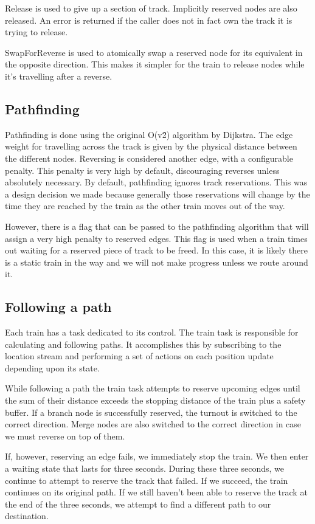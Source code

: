 \documentclass{article}
\begin{document}
Release is used to give up a section of track. Implicitly reserved nodes are also released. An error is returned if the caller does not in fact own the track it is trying to release.

SwapForReverse is used to atomically swap a reserved node for its equivalent in the opposite direction. This makes it simpler for the train to release nodes while it's travelling after a reverse.

\subsection{Pathfinding}

Pathfinding is done using the original O(v\^2) algorithm by Dijkstra. The edge weight for travelling across the track is given by the physical distance between the different nodes. Reversing is considered another edge, with a configurable penalty. This penalty is very high by default, discouraging reverses unless absolutely necessary. By default, pathfinding ignores track reservations. This was a design decision we made because generally those reservations will change by the time they are reached by the train as the other train moves out of the way.

However, there is a flag that can be passed to the pathfinding algorithm that will assign a very high penalty to reserved edges. This flag is used when a train times out waiting for a reserved piece of track to be freed. In this case, it is likely there is a static train in the way and we will not make progress unless we route around it.

\subsection{Following a path}

Each train has a task dedicated to its control. The train task is responsible for calculating and following paths. It accomplishes this by subscribing to the location stream and performing a set of actions on each position update depending upon its state.

While following a path the train task attempts to reserve upcoming edges until the sum of their distance exceeds the stopping distance of the train plus a safety buffer. If a branch node is successfully reserved, the turnout is switched to the correct direction. Merge nodes are also switched to the correct direction in case we must reverse on top of them. 

If, however, reserving an edge fails, we immediately stop the train. We then enter a waiting state that lasts for three seconds. During these three seconds, we continue to attempt to reserve the track that failed. If we succeed, the train continues on its original path. If we still haven't been able to reserve the track at the end of the three seconds, we attempt to find a different path to our destination.
\end{document}
